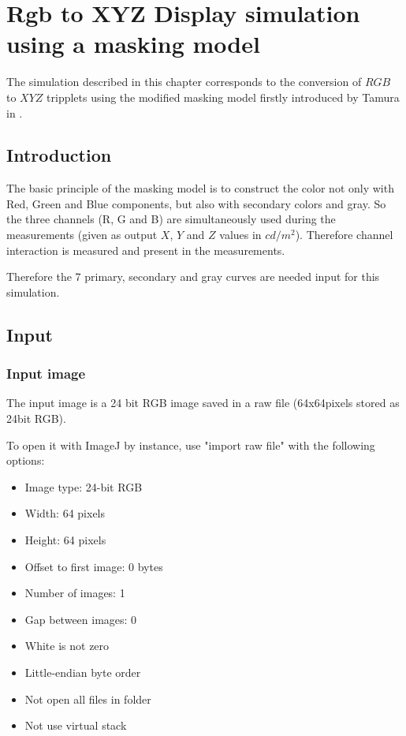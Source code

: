 \chapter{Rgb to XYZ Display simulation using a masking model}
\minitoc{}

The simulation described in this chapter corresponds to the conversion of $RGB$ to $XYZ$ tripplets using the modified masking model firstly introduced by Tamura in \cite{Tam02}.

\section{Introduction}

The basic principle of the masking model is to construct the color not only with Red, Green and Blue components, but also with secondary colors and gray. 
So the three channels (R, G and B) are simultaneously used during the measurements (given as output $X$, $Y$ and $Z$ values in $cd/m^2$). Therefore channel interaction is measured and present in the measurements. 

Therefore the 7 primary, secondary and gray curves are needed input for this simulation.

\section{Input}

\subsection{Input image}

The input image is a 24 bit RGB image saved in a raw file (64x64pixels stored as 24bit RGB).

To open it with ImageJ by instance, use "import raw file" with the following options:
\begin{itemize}
\item Image type: 24-bit RGB
\item Width: 64 pixels
\item Height: 64 pixels
\item Offset to first image: 0 bytes
\item Number of images: 1
\item Gap between images: 0
\item White is not zero
\item Little-endian byte order
\item Not open all files in folder
\item Not use virtual stack
\end{itemize}

